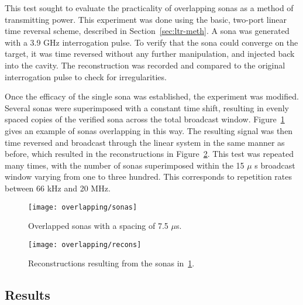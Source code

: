 This test sought to evaluate the practicality of overlapping sonas as a method of transmitting power. This experiment was done using the basic, two-port linear time reversal scheme, described in Section~\ref{sec:ltr-meth}. A sona was generated with a 3.9 GHz interrogation pulse. To verify that the sona could converge on the target, it was time reversed without any further manipulation, and injected back into the cavity. The reconstruction was recorded and compared to the original interrogation pulse to check for irregularities.

Once the efficacy of the single sona was established, the experiment was modified. Several sonas were superimposed with a constant time shift, resulting in evenly spaced copies of the verified sona across the total broadcast window. Figure~\ref{fig:overlapping-sonas} gives an example of sonas overlapping in this way. The resulting signal was then time reversed and broadcast through the linear system in the same manner as before, which resulted in the reconstructions in Figure~\ref{fig:overlapping-recons}. This test was repeated many times, with the number of sonas superimposed within the 15 $\mu$ s broadcast window varying from one to three hundred. This corresponds to repetition rates between 66 kHz and 20 MHz.

\begin{figure}[t]
\centering
\texttt{[image: overlapping/sonas]}
\caption[Overlapped sonas]{Overlapped sonas with a spacing of 7.5 $\mu$s.}
\label{fig:overlapping-sonas}
\end{figure}

\begin{figure}[t]
\centering
\texttt{[image: overlapping/recons]}
\caption[Overlapped reconstructions]{Reconstructions resulting from the sonas in~\ref{fig:overlapping-sonas}.}
\label{fig:overlapping-recons}
\end{figure}


\subsection{Results}


